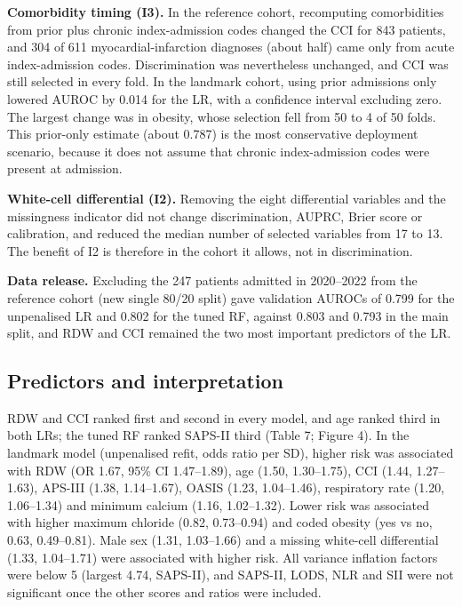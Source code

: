 \textbf{Comorbidity timing (I3).} In the reference cohort, recomputing
comorbidities from prior plus chronic index-admission codes changed the CCI for
843 patients, and 304 of 611 myocardial-infarction diagnoses (about half) came
only from acute index-admission codes. Discrimination was nevertheless
unchanged, and CCI was still selected in every fold. In the landmark cohort,
using prior admissions only lowered AUROC by 0.014 for the LR, with a confidence
interval excluding zero. The largest change was in obesity, whose selection fell
from 50 to 4 of 50 folds. This prior-only estimate (about 0.787) is the most
conservative deployment scenario, because it does not assume that chronic
index-admission codes were present at admission.

\textbf{White-cell differential (I2).} Removing the eight differential variables
and the missingness indicator did not change discrimination, AUPRC, Brier score
or calibration, and reduced the median number of selected variables from 17 to
13. The benefit of I2 is therefore in the cohort it allows, not in
discrimination.

\textbf{Data release.} Excluding the 247 patients admitted in 2020--2022 from
the reference cohort (new single 80/20 split) gave validation AUROCs of 0.799
for the unpenalised LR and 0.802 for the tuned RF, against 0.803 and 0.793 in
the main split, and RDW and CCI remained the two most important predictors of
the LR.

\hypertarget{predictors-and-interpretation}{%
\subsection{Predictors and interpretation}\label{predictors-and-interpretation}}

RDW and CCI ranked first and second in every model, and age ranked third in both
LRs; the tuned RF ranked SAPS-II third (Table 7; Figure 4). In the landmark
model (unpenalised refit, odds ratio per SD), higher risk was associated with
RDW (OR 1.67, 95\% CI 1.47--1.89), age (1.50, 1.30--1.75), CCI (1.44,
1.27--1.63), APS-III (1.38, 1.14--1.67), OASIS (1.23, 1.04--1.46), respiratory
rate (1.20, 1.06--1.34) and minimum calcium (1.16, 1.02--1.32). Lower risk was
associated with higher maximum chloride (0.82, 0.73--0.94) and coded obesity
(yes vs no, 0.63, 0.49--0.81). Male sex (1.31, 1.03--1.66) and a missing
white-cell differential (1.33, 1.04--1.71) were associated with higher risk. All
variance inflation factors were below 5 (largest 4.74, SAPS-II), and SAPS-II,
LODS, NLR and SII were not significant once the other scores and ratios were
included.

